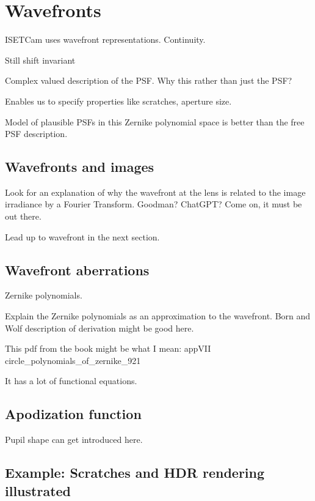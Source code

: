 \documentclass[
  letterpaper,
]{book}
\begin{document}
\chapter{Wavefronts}\label{sec-optics-wavefront}

ISETCam uses wavefront representations. Continuity.

Still shift invariant

Complex valued description of the PSF. Why this rather than just the
PSF?

Enables us to specify properties like scratches, aperture size.

Model of plausible PSFs in this Zernike polynomial space is better than
the free PSF description.

\section{Wavefronts and images}\label{wavefronts-and-images}

Look for an explanation of why the wavefront at the lens is related to
the image irradiance by a Fourier Transform. Goodman? ChatGPT? Come on,
it must be out there.

Lead up to wavefront in the next section.

\section{Wavefront aberrations}\label{wavefront-aberrations}

Zernike polynomials.

Explain the Zernike polynomials as an approximation to the wavefront.
Born and Wolf description of derivation might be good here.

This pdf from the book might be what I mean: appVII
circle\_polynomials\_of\_zernike\_921

It has a lot of functional equations.

\section{Apodization function}\label{apodization-function}

Pupil shape can get introduced here.

\section{Example: Scratches and HDR rendering
illustrated}\label{example-scratches-and-hdr-rendering-illustrated}
\end{document}
